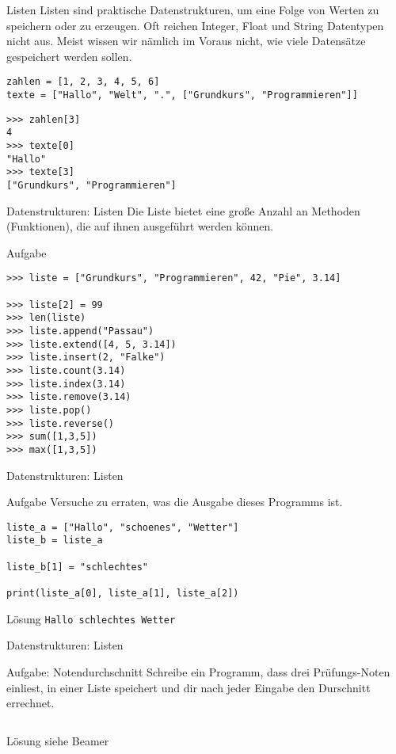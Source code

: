 \begin{frame}[fragile]{Listen}
Listen sind praktische Datenstrukturen, um eine Folge von Werten zu 
speichern oder zu erzeugen.
Oft reichen Integer, Float und String Datentypen nicht aus. Meist wissen wir nämlich im Voraus nicht, 
wie viele Datensätze gespeichert werden sollen.
\pause{}
\begin{lstlisting}
zahlen = [1, 2, 3, 4, 5, 6]
texte = ["Hallo", "Welt", ".", ["Grundkurs", "Programmieren"]]
\end{lstlisting}

\begin{lstlisting}
>>> zahlen[3]
4
>>> texte[0]
"Hallo"
>>> texte[3]
["Grundkurs", "Programmieren"]
\end{lstlisting}
\end{frame}

\begin{frame}[fragile]{Datenstrukturen: Listen}
Die Liste bietet eine große Anzahl an Methoden (Funktionen), die auf ihnen
ausgeführt werden können.
\begin{block}{Aufgabe}
\begin{lstlisting}
>>> liste = ["Grundkurs", "Programmieren", 42, "Pie", 3.14]

>>> liste[2] = 99
>>> len(liste)
>>> liste.append("Passau")
>>> liste.extend([4, 5, 3.14])
>>> liste.insert(2, "Falke")
>>> liste.count(3.14)
>>> liste.index(3.14)
>>> liste.remove(3.14)
>>> liste.pop()
>>> liste.reverse()
>>> sum([1,3,5])
>>> max([1,3,5])
\end{lstlisting}
\end{block}
\end{frame}

\begin{frame}[fragile]{Datenstrukturen: Listen}
\begin{block}{Aufgabe}
Versuche zu erraten, was die Ausgabe dieses Programms ist.
\end{block}

\begin{lstlisting}
liste_a = ["Hallo", "schoenes", "Wetter"]
liste_b = liste_a

liste_b[1] = "schlechtes"

print(liste_a[0], liste_a[1], liste_a[2])  
\end{lstlisting}
\pause{}
\begin{exampleblock}{Lösung}
    \texttt{Hallo schlechtes Wetter}
\end{exampleblock}
\end{frame}

\begin{frame}[fragile]{Datenstrukturen: Listen}
\begin{block}{Aufgabe: Notendurchschnitt}
Schreibe ein Programm, dass drei Prüfungs-Noten einliest, in einer
Liste speichert und dir nach jeder Eingabe den Durschnitt errechnet. 
\end{block}
\begin{lstlisting}

\end{lstlisting}
\pause{}
\begin{exampleblock}{Lösung}
siehe Beamer
\end{exampleblock}
\end{frame}

